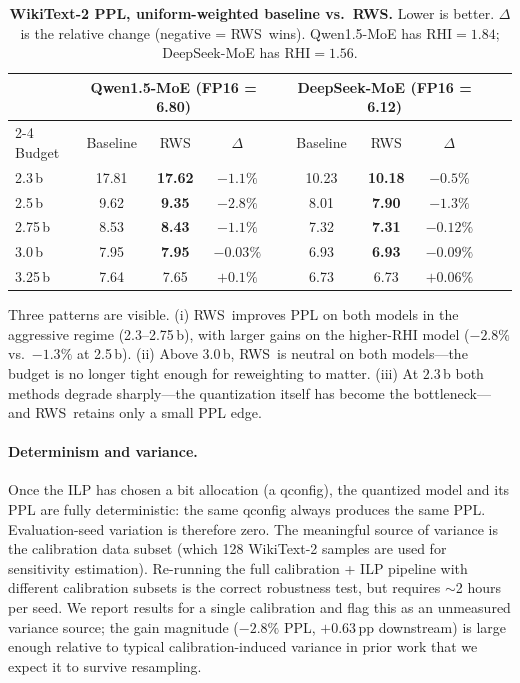 \documentclass{article}
\newcommand{\method}{\textsc{RWS}\xspace}
\newcommand{\rhi}{\mathrm{RHI}}
\begin{document}
\begin{table}[ht]
\centering
\small
\caption{\textbf{WikiText-2 PPL, uniform-weighted baseline vs.\ \method.} Lower is better. $\Delta$ is the relative change (negative = \method\ wins). Qwen1.5-MoE has $\rhi = 1.84$; DeepSeek-MoE has $\rhi = 1.56$.}
\label{tab:ppl}
\begin{tabular}{lccccccccc}
\toprule
 & \multicolumn{3}{c}{Qwen1.5-MoE (FP16 = 6.80)} & & \multicolumn{3}{c}{DeepSeek-MoE (FP16 = 6.12)} \\
\cmidrule{2-4} \cmidrule{6-8}
Budget & Baseline & \method & $\Delta$ & & Baseline & \method & $\Delta$ \\
\midrule
2.3\,b  & 17.81 & \textbf{17.62} & $-1.1\%$ & & 10.23 & \textbf{10.18} & $-0.5\%$ \\
2.5\,b  & 9.62  & \textbf{9.35}  & $\mathbf{-2.8\%}$ & & 8.01  & \textbf{7.90}  & $\mathbf{-1.3\%}$ \\
2.75\,b & 8.53  & \textbf{8.43}  & $\mathbf{-1.1\%}$ & & 7.32  & \textbf{7.31}  & $-0.12\%$ \\
3.0\,b  & 7.95  & \textbf{7.95}  & $-0.03\%$ & & 6.93  & \textbf{6.93}  & $-0.09\%$ \\
3.25\,b & 7.64  & 7.65           & $+0.1\%$  & & 6.73  & 6.73  & $+0.06\%$ \\
\bottomrule
\end{tabular}
\end{table}

Three patterns are visible. (i) \method\ improves PPL on both models in the aggressive regime (2.3--2.75\,b), with larger gains on the higher-$\rhi$ model ($-2.8\%$ vs.\ $-1.3\%$ at 2.5\,b). (ii) Above 3.0\,b, \method\ is neutral on both models---the budget is no longer tight enough for reweighting to matter. (iii) At $2.3$\,b both methods degrade sharply---the quantization itself has become the bottleneck---and \method\ retains only a small PPL edge.

\paragraph{Determinism and variance.} Once the ILP has chosen a bit allocation (a qconfig), the quantized model and its PPL are fully deterministic: the same qconfig always produces the same PPL. Evaluation-seed variation is therefore zero. The meaningful source of variance is the calibration data subset (which 128 WikiText-2 samples are used for sensitivity estimation). Re-running the full calibration + ILP pipeline with different calibration subsets is the correct robustness test, but requires $\sim$2 hours per seed. We report results for a single calibration and flag this as an unmeasured variance source; the gain magnitude ($-2.8\%$ PPL, $+0.63$\,pp downstream) is large enough relative to typical calibration-induced variance in prior work that we expect it to survive resampling.
\end{document}
